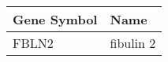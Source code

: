 \begin{tabular}{ll}
\toprule
Gene Symbol &      Name \\
\midrule
      FBLN2 & fibulin 2 \\
\bottomrule
\end{tabular}
